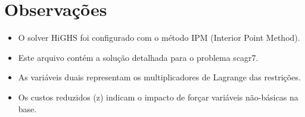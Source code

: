 \documentclass[12pt]{article}
\begin{document}
\section{Observações}

\begin{itemize}
\item O solver HiGHS foi configurado com o método IPM (Interior Point Method).
\item Este arquivo contém a solução detalhada para o problema scagr7.
\item As variáveis duais representam os multiplicadores de Lagrange das restrições.
\item Os custos reduzidos (z) indicam o impacto de forçar variáveis não-básicas na base.
\end{itemize}
\end{document}
